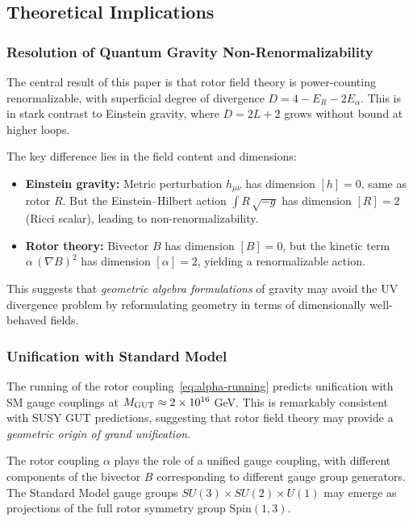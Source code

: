 \documentclass[11pt,a4paper]{article}
\numberwithin{equation}{section}
\theoremstyle{plain}
\theoremstyle{definition}
\theoremstyle{remark}
\newcommand{\Spin}{\mathrm{Spin}}
\begin{document}
\subsection{Theoretical Implications}

\subsubsection{Resolution of Quantum Gravity Non-Renormalizability}

The central result of this paper is that rotor field theory is power-counting renormalizable, with superficial degree of divergence $D=4-E_R-2E_\alpha$. This is in stark contrast to Einstein gravity, where $D=2L+2$ grows without bound at higher loops.

The key difference lies in the field content and dimensions:
\begin{itemize}
  \item \textbf{Einstein gravity:} Metric perturbation $h_{\mu\nu}$ has dimension $[h]=0$, same as rotor $R$. But the Einstein--Hilbert action $\int R\,\sqrt{-g}$ has dimension $[R]=2$ (Ricci scalar), leading to non-renormalizability.
  \item \textbf{Rotor theory:} Bivector $B$ has dimension $[B]=0$, but the kinetic term $\alpha\,(\nabla B)^2$ has dimension $[\alpha]=2$, yielding a renormalizable action.
\end{itemize}

This suggests that \emph{geometric algebra formulations} of gravity may avoid the UV divergence problem by reformulating geometry in terms of dimensionally well-behaved fields.

\subsubsection{Unification with Standard Model}

The running of the rotor coupling~\eqref{eq:alpha-running} predicts unification with SM gauge couplings at $M_{\rm GUT}\approx 2\times 10^{16}$ GeV. This is remarkably consistent with SUSY GUT predictions, suggesting that rotor field theory may provide a \emph{geometric origin of grand unification}.

The rotor coupling $\alpha$ plays the role of a unified gauge coupling, with different components of the bivector $B$ corresponding to different gauge group generators. The Standard Model gauge groups $SU(3)\times SU(2)\times U(1)$ may emerge as projections of the full rotor symmetry group $\Spin(1,3)$.
\end{document}
